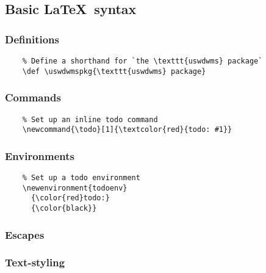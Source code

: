 \subsection{Basic \LaTeX\ syntax}
\subsubsection*{Definitions}
\begin{listing}[H]
  \captionsetup{skip=\skiplistingcaptionlen}
  \begin{verbatim}
    % Define a shorthand for `the \texttt{uswdwms} package`
    \def \uswdwmspkg{\texttt{uswdwms} package}
  \end{verbatim}
  \caption{\LaTeX\ \texttt{\textbackslash def} command examples}
  \label{example:lst:def}
\end{listing}
\subsubsection*{Commands}
\begin{listing}[H]
  \captionsetup{skip=\skiplistingcaptionlen}
  \begin{verbatim}
    % Set up an inline todo command
    \newcommand{\todo}[1]{\textcolor{red}{todo: #1}}
  \end{verbatim}
  \caption{\LaTeX\ \texttt{\textbackslash newcommand} command example}
  \label{example:lst:newcommand}
\end{listing}
\subsubsection*{Environments}
\begin{listing}[H]
  \captionsetup{skip=\skiplistingcaptionlen}
  \begin{verbatim}
    % Set up a todo environment
    \newenvironment{todoenv}
      {\color{red}todo:}
      {\color{black}}
  \end{verbatim}
  \caption{\LaTeX\ \texttt{\textbackslash newenvironment} command example}
  \label{example:lst:newenvironment}
\end{listing}
\subsubsection*{Escapes}

\subsubsection*{Text-styling}

